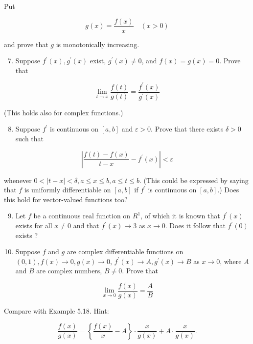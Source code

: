 \documentclass[10pt]{article}
\begin{document}
Put

$$
g(x)=\frac{f(x)}{x} \quad(x>0)
$$

and prove that $g$ is monotonically increasing.

\begin{enumerate}
  \setcounter{enumi}{6}
  \item Suppose $f^{\prime}(x), g^{\prime}(x)$ exist, $g^{\prime}(x) \neq 0$, and $f(x)=g(x)=0$. Prove that
\end{enumerate}

$$
\lim _{t \rightarrow x} \frac{f(t)}{g(t)}=\frac{f^{\prime}(x)}{g^{\prime}(x)}
$$

(This holds also for complex functions.)

\begin{enumerate}
  \setcounter{enumi}{7}
  \item Suppose $f^{\prime}$ is continuous on $[a, b]$ and $\varepsilon>0$. Prove that there exists $\delta>0$ such that
\end{enumerate}

$$
\left|\frac{f(t)-f(x)}{t-x}-f^{\prime}(x)\right|<\varepsilon
$$

whenever $0<|t-x|<\delta, a \leq x \leq b, a \leq t \leq b$. (This could be expressed by saying that $f$ is uniformly differentiable on $[a, b]$ if $f^{\prime}$ is continuous on $[a, b]$.) Does this hold for vector-valued functions too?

\begin{enumerate}
  \setcounter{enumi}{8}
  \item Let $f$ be a continuous real function on $R^{1}$, of which it is known that $f^{\prime}(x)$ exists for all $x \neq 0$ and that $f^{\prime}(x) \rightarrow 3$ as $x \rightarrow 0$. Does it follow that $f^{\prime}(0)$ exists ?

  \item Suppose $f$ and $g$ are complex differentiable functions on $(0,1), f(x) \rightarrow 0, g(x) \rightarrow 0$, $f^{\prime}(x) \rightarrow A, g^{\prime}(x) \rightarrow B$ as $x \rightarrow 0$, where $A$ and $B$ are complex numbers, $B \neq 0$. Prove that

\end{enumerate}

$$
\lim _{x \rightarrow 0} \frac{f(x)}{g(x)}=\frac{A}{B}
$$

Compare with Example 5.18. Hint:

$$
\frac{f(x)}{g(x)}=\left\{\frac{f(x)}{x}-A\right\} \cdot \frac{x}{g(x)}+A \cdot \frac{x}{g(x)} .
$$
\end{document}
